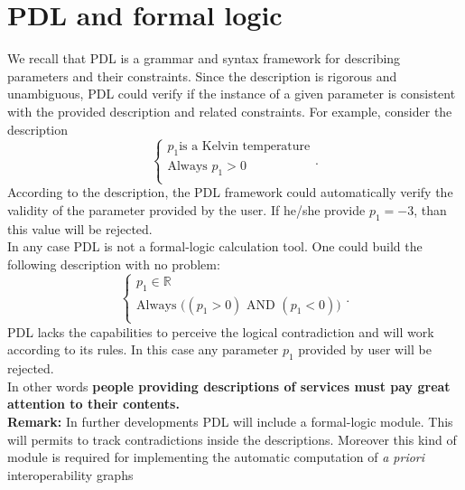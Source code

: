 \documentclass[a4paper,11pt] {article}
\begin{document}
\section{PDL and formal logic}
We recall that PDL is a grammar and syntax framework for describing parameters and their
constraints. Since the description is rigorous and unambiguous, PDL could verify if the instance of
a given parameter is consistent with the provided description and related constraints. For example,
consider the description
\begin{equation}
\left\{
\begin{array}{l}
p_1 \mbox{is a Kelvin temperature}\\
\mbox{Always }  p_1 > 0 \\
\end{array}
\right..
\end{equation}
According to the description, the PDL framework could automatically verify the validity of the
parameter provided by the user.
If he/she provide $p_1=-3$, than this value will be rejected.\\
In any case PDL is not a formal-logic calculation tool. One could build the following description
with no problem:
\begin{equation}
\left\{
\begin{array}{l}
p_1 \in \mathbb R\\
\displaystyle \mbox{Always } \big(  (p_1 > 0) \mbox{ AND } (p_1 < 0) \big)\\
\end{array}
\right..
\end{equation}
PDL lacks the capabilities to perceive the logical contradiction and will work according to its
rules. In this case any parameter $p_1$ provided by user will be rejected.\\
In other words {\bf people providing descriptions of services must pay great attention to their
contents.}\\

{\bf Remark:} In further developments PDL will include a formal-logic module. This will permits to
track contradictions inside the descriptions. Moreover this kind of module is required for
implementing the automatic computation of
{\it a priori} interoperability graphs %
\end{document}

